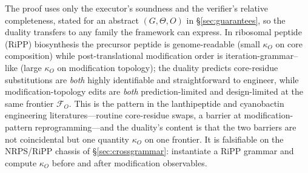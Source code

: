 \begin{corollary}\label{cor:crossfamily}
The proof uses only the executor's soundness and the verifier's relative completeness, stated for an
abstract $(G,\Theta,O)$ in \S\ref{sec:guarantees}, so the duality transfers to any family the framework can
express. In ribosomal peptide (RiPP) biosynthesis the precursor peptide is genome-readable (small
$\kappa_O$ on core composition) while post-translational modification order is iteration-grammar--like
(large $\kappa_O$ on modification topology); the duality predicts core-residue substitutions are
\emph{both} highly identifiable and straightforward to engineer, while modification-topology edits are
\emph{both} prediction-limited and design-limited at the same frontier $\mathcal{F}_O$. This is the pattern
in the lanthipeptide \citep{repka2017} and cyanobactin \citep{donia2008} engineering literatures---routine
core-residue swaps, a barrier at modification-pattern reprogramming---and the duality's content is that the
two barriers are not coincidental but one quantity $\kappa_O$ on one frontier. It is falsifiable on the
NRPS/RiPP chassis of \S\ref{sec:crossgrammar}: instantiate a RiPP grammar and compute $\kappa_O$ before and
after modification observables.
\end{corollary}

